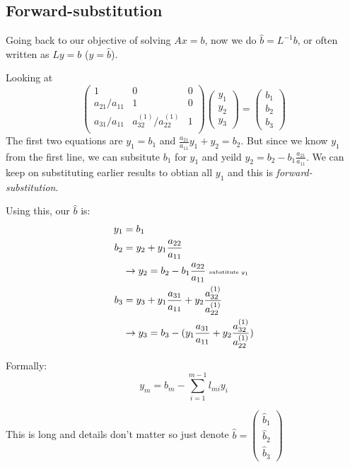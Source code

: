 \subsection{Forward-substitution}

Going back to our objective of solving $Ax=b$, now we do $\hat b =
L^{-1}b$, or often written as $Ly= b$ ($y=\hat b$).

Looking at $$\begin{pmatrix}
  1&0&0\\
  a_{21}/a_{11}& 1 & 0\\
a_{31}/a_{11}& a_{32}^{(1)}/a_{22}^{(1)}& 1 \\
\end{pmatrix}\begin{pmatrix}y_1 \\y_2 \\ y_3\end{pmatrix}=
\begin{pmatrix}b_1 \\b_2 \\ b_3\end{pmatrix}$$
The first two equations are $y_1 = b_1$ and $\frac{a_{21}}{a_{11}}y_1
+ y_2 = b_2$. But since we know $y_1$ from the first line, we can
subsitute $b_1$ for $y_1$ and yeild $y_2 = b_2 -
b_1\frac{a_{21}}{a_{11}}$. We can keep on substituting earlier results
to obtian all $y_1$ and this is \emph{forward-substitution}.


Using this, our $\hat b$ is:
\begin{align*}
  y_1 &= b_1\\
  b_2 &= y_2 + y_1\frac{a_{22}}{a_{11}}\\
  &\rightarrow y_2 = b_2 - b_1\frac{a_{22}}{a_{11}} \text{ \tiny substitute $y_1$ }\\
  b_3 &= y_3 + y_1\frac{a_{31}}{a_{11}} +y_2\frac{a_{32}^{(1)}}{a_{22}^{(1)}}\\
  &\rightarrow y_3= b_3 - (y_1\frac{a_{31}}{a_{11}}
  +y_2\frac{a_{32}^{(1)}}{a_{22}^{(1)}})\\
\end{align*}

Formally:
$$y_m= b_m - \sum_{i=1}^{m-1}l_{mi}y_{i}$$


This is long and details don't matter so just denote $\hat b = (
\begin{smallmatrix}
\hat b_1\\ \hat b_2 \\ \hat b_3  
\end{smallmatrix})$

